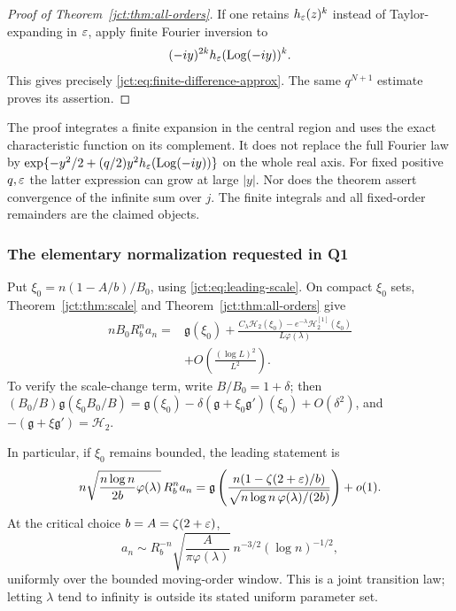 \begin{proof}[Proof of Theorem~\ref{jct:thm:all-orders}]
If one retains $h_\varepsilon(z)^k$ instead of Taylor-expanding in
$\varepsilon$, apply finite Fourier inversion to
\[
 (-iy)^{2k}h_\varepsilon(\operatorname{Log}(-iy))^k.
\]
This gives precisely \eqref{jct:eq:finite-difference-approx}. The same
$q^{N+1}$ estimate proves its assertion.
\end{proof}

\begin{remark}
The proof integrates a finite expansion in the central region and
uses the exact characteristic function on its complement. It does not
replace the full Fourier law by
$\exp\{-y^2/2+(q/2)y^2h_\varepsilon(\operatorname{Log}(-iy))\}$ on the whole real axis.
For fixed positive $q,\varepsilon$ the latter expression can grow at large
$|y|$. Nor does the theorem assert convergence of the infinite sum
over $j$. The finite integrals and all fixed-order remainders are the
claimed objects.
\end{remark}

\subsubsection{The elementary normalization requested in Q1}

Put $\xi_0=n(1-A/b)/B_0$, using \eqref{jct:eq:leading-scale}.
On compact $\xi_0$ sets, Theorem~\ref{jct:thm:scale} and Theorem~\ref{jct:thm:all-orders} give
\begin{equation}\label{jct:eq:elementary-first}
\begin{split}
 nB_0R_b^n a_n={}&\mathfrak{g}(\xi_0)
   +\frac{C_\lambda\mathcal{H}_2(\xi_0)
               -e^{-\lambda}\mathcal{H}_2^{[1]}(\xi_0)}{L\varphi(\lambda)}\\
 &+O\left(\frac{(\log L)^2}{L^2}\right).
\end{split}
\end{equation}
To verify the scale-change term, write
$B/B_0=1+\delta$; then
$(B_0/B)\mathfrak{g}(\xi_0B_0/B)
=\mathfrak{g}(\xi_0)-\delta(\mathfrak{g}+\xi_0\mathfrak{g}')(\xi_0)+O(\delta^2)$,
and $-(\mathfrak{g}+\xi\mathfrak{g}')=\mathcal{H}_2$.

In particular, if $\xi_0$ remains bounded, the leading statement is
\begin{equation}\label{jct:eq:Q1-solved}
 n\sqrt{\frac{n\log n}{2b}\varphi(\lambda)}\,R_b^n a_n
 =\mathfrak{g}\left(
 \frac{n(1-\zeta(2+\varepsilon)/b)}{
               \sqrt{n\log n\,\varphi(\lambda)/(2b)}}\right)+o(1).
\end{equation}
At the critical choice $b=A=\zeta(2+\varepsilon)$,
\begin{equation}\label{jct:eq:critical-joint-leading}
 a_n\sim R_b^{-n}
   \sqrt{\frac{A}{\pi\varphi(\lambda)}}\,
                   n^{-3/2}(\log n)^{-1/2},
\end{equation}
uniformly over the bounded moving-order window. This is a joint
transition law; letting $\lambda$ tend to infinity is outside its
stated uniform parameter set.

